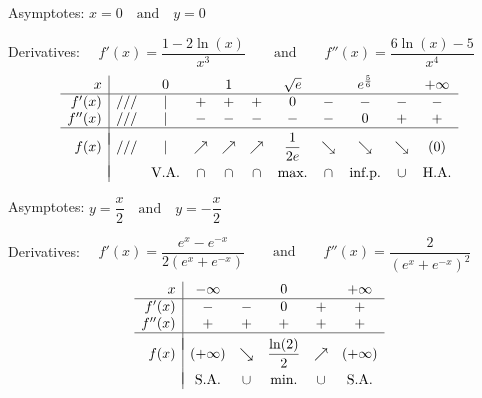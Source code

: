 \begin{Answer}
    	\Question Asymptotes: \quad $x=0\quad\mbox{and}\quad y=0$\par
    		Derivatives: $\quad f'(x)=\dfrac{1-2\ln (x)}{x^3}\qquad\mbox{and}\qquad f''(x)=\dfrac{6\ln (x)-5}{x^4}$
    		\[ \begin{array}{r|cccccccccc}
    		x &  & 0 & & 1 &  & \sqrt{e} &  & e^\frac{5}{6} & & +\infty \\
    		\hline
    		f'(x)   & /// & | & + & + & + & 0 &  - & - & - & - \\
    		f''(x)  & /// & | & - & - & - & - & - & 0 & + & + \\
    		\hline
    		&&&&&&&&&&\vspace{-0.3cm}\\
    		f(x)    & /// & | & \nearrow & \nearrow & \nearrow & \dfrac{1}{2e} & \searrow & \searrow & \searrow & (0)\\
    		&&&&&&&&\vspace{-0.3cm}\\                                                                              
    		& & \mbox{V.A.} & \cap & \cap & \cap & \mbox{max.} & \cap & \mbox{inf.p.} & \cup & \mbox{H.A.} \\
    		\end{array}\]
    		
    
    	\Question Asymptotes: \quad $y=\dfrac{x}{2}\quad\mbox{and}\quad y=-\dfrac{x}{2}$\par
    		Derivatives: $\quad f'(x)=\dfrac{e^{x}-e^{-x}}{2(e^{x}+e^{-x})}\qquad\mbox{and}\qquad f''(x)=\dfrac{2}{(e^{x}+e^{-x})^2}$
    		\[ \begin{array}{r|ccccc}
    		x &  -\infty &  & 0 & &+\infty \\
    		\hline
    		f'(x)   &  - & - & 0 & + & + \\
    		f''(x)  &  + & + & + & + & + \\
    		\hline
    		&&&&&\vspace{-0.3cm}\\
    		f(x)    &  (+\infty) & \searrow & \dfrac{\ln (2)}{2} & \nearrow & (+\infty)\\
    		&&&&&\vspace{-0.3cm}\\                                                                              
    		& \mbox{S.A.} & \cup & \mbox{min.} & \cup & \mbox{S.A.} \\
    		\end{array}\]
    		

\end{Answer}
